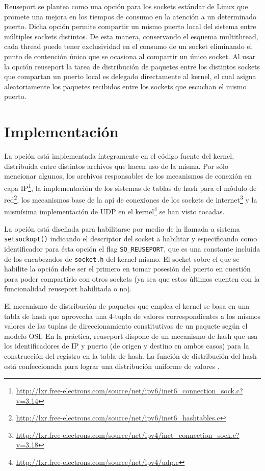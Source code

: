 Reuseport se plantea como una opción para los sockets estándar de Linux que promete una mejora en los tiempos de consumo en la atención a un determinado puerto. Dicha opción permite compartir un mismo puerto local del sistema entre múltiples sockets distintos. De esta manera, conservando el esquema multithread, cada thread puede tener exclusividad en el consumo de un socket eliminando el punto de contención único que se ocasiona al compartir un único socket. Al usar la opción reuseport la tarea de distribución de paquetes entre los distintos sockets que compartan un puerto local es delegado directamente al kernel, el cual asigna aleatoriamente los paquetes recibidos entre los sockets que escuchan el mismo puerto.

\section{Implementación}
La opción está implementada íntegramente en el código fuente del kernel, distribuida entre distintos archivos que hacen uso de la misma. Por sólo mencionar algunos, los archivos responsables de los mecanismos de conexión en capa IP\footnote{\url{http://lxr.free-electrons.com/source/net/ipv6/inet6_connection_sock.c?v=3.14}}, la implementación de los sistemas de tablas de hash para el módulo de red\footnote{\url{http://lxr.free-electrons.com/source/net/ipv6/inet6_hashtables.c}}, los mecanismos base de la api de conexiones de los sockets de internet\footnote{\url{http://lxr.free-electrons.com/source/net/ipv4/inet_connection_sock.c?v=3.18}} y la mismísima implementación de UDP en el kernel\footnote{\url{http://lxr.free-electrons.com/source/net/ipv4/udp.c}} se han visto tocadas.

La opción está diseñada para habilitarse por medio de la llamada a sistema \verb=setsockopt()= indicando el descriptor del socket a habilitar y especificando como identificador para ésta opción el flag \verb=SO_REUSEPORT=, que es una constante incluida de los encabezados de \verb=socket.h= del kernel mismo. El socket sobre el que se habilite la opción debe ser el primero en tomar posesión del puerto en cuestión para poder compartirlo con otros sockets (ya sea que estos últimos cuenten con la funcionalidad reuseport habilitada o no).

El mecanismo de distribución de paquetes que emplea el kernel se basa en una tabla de hash que aprovecha una 4-tupla de valores correspondientes a los mismos valores de las tuplas de direccionamiento constitutivas de un paquete según el modelo OSI. En la práctica, reuseport dispone de un mecanismo de hash que usa los identificadores de IP y puerto (de origen y destino en ambos casos) para la construcción del registro en la tabla de hash. La función de distribución del hash está confeccionada para lograr una distribución uniforme de valores \cite{article:reuseport}.



